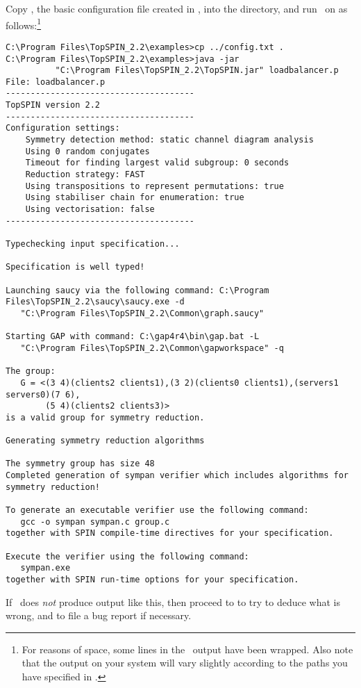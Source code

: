 Copy , the basic configuration file created in
, into the  directory,
and run \topspin\ on  as
follows:\footnote{For reasons of space, some lines in the \topspin\
output have been wrapped. Also note that the output on your system
will vary slightly according to the paths you have specified in
.}
%
\begin{lstlisting}
C:\Program Files\TopSPIN_2.2\examples>cp ../config.txt .
C:\Program Files\TopSPIN_2.2\examples>java -jar
          "C:\Program Files\TopSPIN_2.2\TopSPIN.jar" loadbalancer.p
File: loadbalancer.p
--------------------------------------
TopSPIN version 2.2
--------------------------------------
Configuration settings:
    Symmetry detection method: static channel diagram analysis
    Using 0 random conjugates
    Timeout for finding largest valid subgroup: 0 seconds
    Reduction strategy: FAST
    Using transpositions to represent permutations: true
    Using stabiliser chain for enumeration: true
    Using vectorisation: false
--------------------------------------

Typechecking input specification...

Specification is well typed!

Launching saucy via the following command: C:\Program Files\TopSPIN_2.2\saucy\saucy.exe -d
   "C:\Program Files\TopSPIN_2.2\Common\graph.saucy"

Starting GAP with command: C:\gap4r4\bin\gap.bat -L
   "C:\Program Files\TopSPIN_2.2\Common\gapworkspace" -q

The group:
   G = <(3 4)(clients2 clients1),(3 2)(clients0 clients1),(servers1 servers0)(7 6),
        (5 4)(clients2 clients3)>
is a valid group for symmetry reduction.

Generating symmetry reduction algorithms

The symmetry group has size 48
Completed generation of sympan verifier which includes algorithms for symmetry reduction!

To generate an executable verifier use the following command:
   gcc -o sympan sympan.c group.c
together with SPIN compile-time directives for your specification.

Execute the verifier using the following command:
   sympan.exe
together with SPIN run-time options for your specification.
\end{lstlisting}
%
If \topspin\ does \emph{not} produce output like this, then proceed
to \chapref{troubleshooting} to try to deduce what is wrong, and to
file a bug report if necessary.


